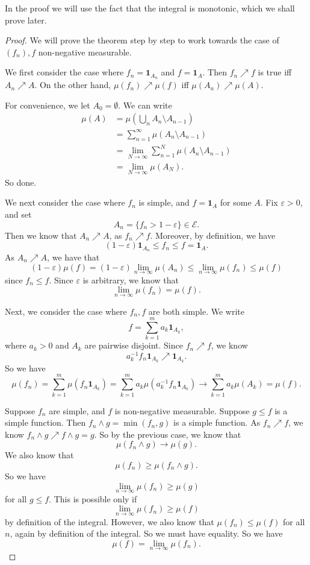 \documentclass[a4paper]{article}
\begin{document}
In the proof we will use the fact that the integral is monotonic, which we shall prove later.
\begin{proof}
  We will prove the theorem step by step to work towards the case of $(f_n), f$ non-negative measurable.

  We first consider the case where $f_n = \mathbf{1}_{A_n}$ and $f = \mathbf{1}_A$. Then $f_n \nearrow f$ is true iff $A_n \nearrow A$. On the other hand, $\mu(f_n) \nearrow \mu(f)$ iff $\mu(A_n) \nearrow \mu(A)$.

  For convenience, we let $A_0 = \emptyset$. We can write
  \begin{align*}
    \mu(A) &= \mu\left(\bigcup_n A_n \setminus A_{n - 1}\right) \\
    &= \sum_{n = 1}^\infty \mu(A_n \setminus A_{n - 1}) \\
    &= \lim_{N \to \infty} \sum_{n = 1}^N \mu(A_n \setminus A_{n - 1}) \\
    &= \lim_{N \to \infty}\mu (A_N).
  \end{align*}
  So done.

  \separator

  We next consider the case where $f_n$ is simple, and $f = \mathbf{1}_A$ for some $A$. Fix $\varepsilon > 0$, and set
  \[
    A_n = \{f_n > 1 - \varepsilon\} \in \mathcal{E}.
  \]
  Then we know that $A_n \nearrow A$, as $f_n \nearrow f$. Moreover, by definition, we have
  \[
    (1 - \varepsilon) \mathbf{1}_{A_n} \leq f_n \leq f = \mathbf{1}_A.
  \]
  As $A_n \nearrow A$, we have that
  \[
    (1 - \varepsilon) \mu(f) = (1 - \varepsilon) \lim_{n \to \infty} \mu(A_n) \leq \lim_{n \to \infty} \mu(f_n) \leq \mu(f)
  \]
  since $f_n \leq f$. Since $\varepsilon$ is arbitrary, we know that
  \[
    \lim_{n \to \infty} \mu(f_n) = \mu(f).
  \]

  \separator

  Next, we consider the case where $f_n, f$ are both simple. We write
  \[
    f = \sum_{k = 1}^m a_k \mathbf{1}_{A_k},
  \]
  where $a_k > 0$ and $A_k$ are pairwise disjoint. Since $f_n \nearrow f$, we know
  \[
    a_k^{-1} f_n \mathbf{1}_{A_k} \nearrow \mathbf{1}_{A_k}.
  \]
  So we have
  \[
    \mu(f_n) = \sum_{k = 1}^m \mu(f_n \mathbf{1}_{A_k}) = \sum_{k = 1}^m a_k \mu(a_k^{-1} f_n \mathbf{1}_{A_k}) \to \sum_{k = 1}^m a_k \mu(A_k) = \mu(f).
  \]

  \separator

  Suppose $f_n$ are simple, and $f$ is non-negative measurable. Suppose $g \leq f$ is a simple function. Then $f_n \wedge g = \min(f_n, g)$ is a simple function. As $f_n \nearrow f$, we know $f_n \wedge g \nearrow f \wedge g = g$. So by the previous case, we know that
  \[
    \mu(f_n \wedge g) \to \mu(g).
  \]
  We also know that
  \[
    \mu(f_n) \geq \mu(f_n\wedge g).
  \]
  So we have
  \[
    \lim_{n \to \infty} \mu(f_n) \geq \mu(g)
  \]
  for all $g \leq f$. This is possible only if
  \[
    \lim_{n \to \infty} \mu(f_n) \geq \mu(f)
  \]
  by definition of the integral. However, we also know that $\mu(f_n) \leq \mu(f)$ for all $n$, again by definition of the integral. So we must have equality. So we have
  \[
    \mu(f) = \lim_{n \to \infty} \mu(f_n).
  \]


\end{proof}
\end{document}
